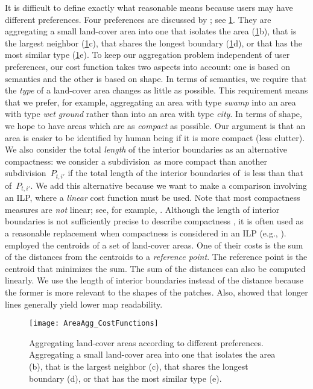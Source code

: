 \documentclass[acmsmall,natbib=false]{acmart}
\begin{document}
It is difficult to define exactly what reasonable means 
because users may have different preferences.
Four preferences are discussed by
\textcite{Cheng2006}; see \fig\ref{fig:AreaAgg_Preferences}.
They are aggregating a small land-cover area into one 
that isolates the area 
(\fig\ref{fig:AreaAgg_Preferences}b), 
that is the largest neighbor 
(\fig\ref{fig:AreaAgg_Preferences}c), 
that shares the longest boundary 
(\fig\ref{fig:AreaAgg_Preferences}d), or 
that has the most similar type
(\fig\ref{fig:AreaAgg_Preferences}e).
To keep our aggregation problem independent of user preferences,
our cost function takes two aspects into account: 
one is based on semantics and 
the other is based on shape.
%
In terms of semantics, we require that 
the \emph{type} of a land-cover area changes 
as little as possible.
This requirement means that we prefer, for example, 
aggregating an area with type \emph{swamp} 
into an area with type \emph{wet ground} 
rather than into an area with type \emph{city}.
%
In terms of shape, we hope to have areas 
which are as \emph{compact} as possible.
Our argument is that an area is easier 
to be identified by human being 
if it is more compact (less clutter).
%
We also consider the total \emph{length} 
of the interior boundaries as an alternative compactness:
we consider a subdivision~\Pnode as more compact than
another subdivision~$P_{t,i'}$ if the total length of the interior boundaries of~\Pnode is less than that of~$P_{t,i'}$.
We add this alternative because we want to make a comparison 
involving an ILP, 
where a \emph{linear} cost function must be used.
Note that most compactness measures
are \emph{not} linear;
see, for example, \textcite{Maceachren1985,Li2013Compactness}.
Although the length of interior boundaries 
is not sufficiently precise 
to describe compactness \parencite{Young1988},
it is often used as a reasonable replacement
when compactness is considered in an ILP
(e.g., \citealp{Minas2016,Wright1983}).
\textcite{HaunertWolff2010AreaAgg} employed 
the centroids of a set of land-cover areas.
One of their costs is the sum of the distances 
from the centroids to a \emph{reference point}.
The reference point is the centroid
that minimizes the sum.
The sum of the distances can also be computed linearly.
We use the length of interior boundaries 
instead of the distance because the former 
is more relevant to the shapes of the patches.
Also, \textcite{Harrie2015Readability} showed that
longer lines generally yield lower map readability.

\begin{figure}[tb]
\centering
\texttt{[image: AreaAgg\_CostFunctions]}
\caption{Aggregating land-cover areas 
	according to different preferences.
	Aggregating a small land-cover area into one 
	that isolates the area (b), 
	that is the largest neighbor (c), 
	that shares the longest boundary (d), or 
	that has the most similar type (e).}
\label{fig:AreaAgg_Preferences}	
\end{figure}
\end{document}

